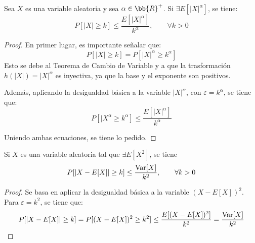 \begin{coro}
    Sea $X$ es una variable aleatoria y sea $\alpha\in \bb{R}^+$. Si $\exists E[|X|^\alpha]$, se tiene:
    \begin{equation*}
        P[|X|\geq k]\leq \frac{E[|X|^\alpha]}{k^\alpha},\qquad \forall k>0
    \end{equation*}
\end{coro}
\begin{proof}
    En primer lugar, es importante señalar que:
    \begin{equation*}
        P[|X|\geq k]=P[|X|^\alpha \geq k^\alpha]
    \end{equation*}
    Esto se debe al Teorema de Cambio de Variable y a que la trasformación $h(|X|)=|X|^\alpha$ es inyectiva, ya que la base y el exponente son positivos.

    Además, aplicando la desigualdad básica a la variable $|X|^\alpha$, con $\varepsilon=k^\alpha$, se tiene que:
    \begin{equation*}
        P[|X^\alpha\geq k^\alpha]\leq \frac{E[|X|^\alpha]}{k^\alpha}
    \end{equation*}

    Uniendo ambas ecuaciones, se tiene lo pedido.
\end{proof}

\begin{coro}
    Si $X$ es una variable aleatoria tal que $\exists E[X^2]$, se tiene
    \begin{equation*}
        P[|X-E[X]|\geq k]\leq \frac{\operatorname{Var}[X]}{k^2},\qquad \forall k>0
    \end{equation*}
\end{coro}
\begin{proof}
    Se basa en aplicar la desigualdad básica a la variable $(X-E[X])^2$. Para $\varepsilon=k^2$, se tiene que:
    \begin{equation*}
        P[|X-E[X]|\geq k] = P[(X-E[X])^2\geq k^2] \leq \frac{E[(X-E[X])^2]}{k^2} = \frac{\operatorname{Var}[X]}{k^2}
    \end{equation*}
\end{proof}

